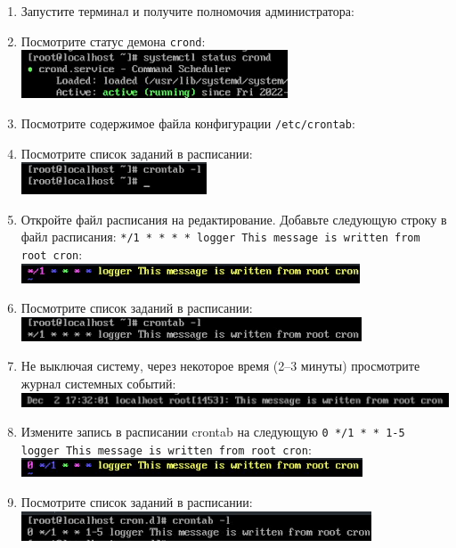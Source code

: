 \documentclass[12pt]{article}
\begin{document}
\begin{enumerate}
	\item Запустите терминал и получите полномочия администратора:
	\item Посмотрите статус демона \texttt{crond}:
	      \\\includegraphics{1.png}
	\item Посмотрите содержимое файла конфигурации \texttt{/etc/crontab}:
	\item Посмотрите список заданий в расписании:
	      \\\includegraphics{2.png}
	\item Откройте файл расписания на редактирование. Добавьте следующую строку в файл расписания: \texttt{*/1 * * * * logger This message is written from root cron}:
	      \\\includegraphics{3.png}
	\item Посмотрите список заданий в расписании:
	      \\\includegraphics{4.png}
	\item Не выключая систему, через некоторое время (2–3 минуты) просмотрите журнал системных событий:
	      \\\includegraphics{5.png}
	\item Измените запись в расписании crontab на следующую \texttt{0 */1 * * 1-5 logger This message is written from root cron}:
	      \\\includegraphics{6.png}
	\item Посмотрите список заданий в расписании:
	      \\\includegraphics{7.png}

\end{enumerate}
\end{document}
